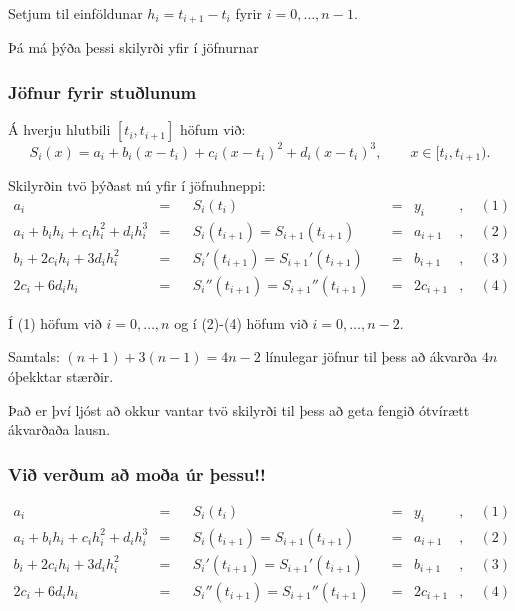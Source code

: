 \documentclass[icelandic,a4paper,12pt]{article}
\begin{document}
\pause
\smallskip
Setjum til einföldunar $h_i = t_{i+1}-t_i$ fyrir $i = 0,
\ldots, n-1$.

\pause
\smallskip
 Þá má þýða þessi skilyrði yfir í jöfnurnar 


\subsubsection{Jöfnur fyrir stuðlunum} 
Á hverju hlutbili $[t_i,t_{i+1}]$ höfum við:
\begin{equation*}
	S_i(x) = a_i+b_i(x-t_i)+c_i(x-t_i)^2+d_i(x-t_i)^3, 
		\qquad x\in [t_i,t_{i+1}).
\end{equation*}


\pause
Skilyrðin tvö þýðast nú yfir í jöfnuhneppi:
\begin{align*}
	a_i &=& &S_i(t_i)& &=& y_i  
		&, \quad (1) \\
	a_i + b_ih_i + c_ih_i^2 + d_ih_i^3 &=& &S_i(t_{i+1})
		= S_{i+1}(t_{i+1})& &=& a_{i+1} 
		&, \quad (2) \\
	b_i + 2c_ih_i + 3d_ih_i^2 &=& &S_i'(t_{i+1}) 
		= S_{i+1}'(t_{i+1})& &=& b_{i+1}
		&, \quad (3) \\
	2c_i + 6d_ih_i &=& &S_i''(t_{i+1})
		= S_{i+1}''(t_{i+1})& &=& 2c_{i+1}
		&, \quad (4)
\end{align*}

\pause
Í (1) höfum við $i = 0,\ldots,n$ og í (2)-(4) höfum við $i=0,\ldots,n-2$.  

\smallskip
Samtals:  $(n+1)+3(n-1)=4n-2$ línulegar jöfnur til þess að ákvarða 
$4n$ óþekktar stærðir.

\pause
\smallskip
Það er því ljóst að okkur vantar tvö skilyrði til þess að geta 
fengið ótvírætt ákvarðaða lausn. 


\subsubsection{Við verðum að moða úr þessu!!} 
\begin{align*}
	a_i &=& &S_i(t_i)& &=& y_i  
		&, \quad (1) \\
	a_i + b_ih_i + c_ih_i^2 + d_ih_i^3 &=& &S_i(t_{i+1})
		= S_{i+1}(t_{i+1})& &=& a_{i+1} 
		&, \quad (2) \\
	b_i + 2c_ih_i + 3d_ih_i^2 &=& &S_i'(t_{i+1}) 
		= S_{i+1}'(t_{i+1})& &=& b_{i+1}
		&, \quad (3) \\
	2c_i + 6d_ih_i &=& &S_i''(t_{i+1})
		= S_{i+1}''(t_{i+1})& &=& 2c_{i+1}
		&, \quad (4)
\end{align*}
\end{document}
